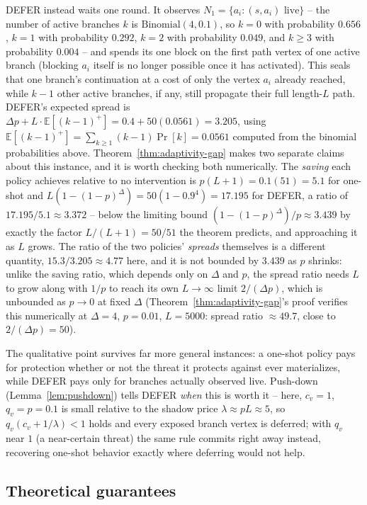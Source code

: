 \documentclass[preprint,11pt]{elsarticle}
\theoremstyle{definition}
\theoremstyle{remark}
\begin{document}
DEFER instead waits one round. It observes $N_1=\{a_i:(s,a_i)\text{ live}\}$
-- the number of active branches $k$ is $\mathrm{Binomial}(4,0.1)$, so
$k=0$ with probability $0.656$, $k=1$ with probability $0.292$, $k=2$ with
probability $0.049$, and $k\ge3$ with probability $0.004$ -- and spends its
one block on the first path vertex of one active branch (blocking $a_i$
itself is no longer possible once it has activated). This seals that one
branch's continuation at a cost of only the vertex $a_i$ already reached,
while $k-1$ other active branches, if any, still propagate their full
length-$L$ path. DEFER's expected spread is
$\Delta p+L\cdot\mathbb E[(k-1)^+]=0.4+50(0.0561)=3.205$, using
$\mathbb E[(k-1)^+]=\sum_{k\ge1}(k-1)\Pr[k]=0.0561$ computed from the
binomial probabilities above. Theorem~\ref{thm:adaptivity-gap} makes two
separate claims about this instance, and it is worth checking both
numerically. The \emph{saving} each policy achieves relative to no
intervention is $p(L+1)=0.1(51)=5.1$ for one-shot and
$L(1-(1-p)^\Delta)=50(1-0.9^4)=17.195$ for DEFER, a ratio of
$17.195/5.1\approx3.372$ -- below the limiting bound
$(1-(1-p)^\Delta)/p\approx3.439$ by exactly the factor $L/(L+1)=50/51$ the
theorem predicts, and approaching it as $L$ grows. The ratio of the two
policies' \emph{spreads} themselves is a different quantity,
$15.3/3.205\approx4.77$ here, and it is not bounded by $3.439$ as $p$
shrinks: unlike the saving ratio, which depends only on $\Delta$ and $p$,
the spread ratio needs $L$ to grow along with $1/p$ to reach its own
$L\to\infty$ limit $2/(\Delta p)$, which is unbounded as $p\to0$ at fixed
$\Delta$ (Theorem~\ref{thm:adaptivity-gap}'s proof verifies this
numerically at $\Delta=4$, $p=0.01$, $L=5000$: spread ratio $\approx49.7$,
close to $2/(\Delta p)=50$).

The qualitative point survives far more general instances: a one-shot
policy pays for protection whether or not the threat it protects against
ever materializes, while DEFER pays only for branches actually observed
live. Push-down (Lemma~\ref{lem:pushdown}) tells DEFER \emph{when} this is
worth it -- here, $c_v=1$, $q_v=p=0.1$ is small relative to the shadow
price $\lambda\approx pL\approx5$, so $q_v(c_v+1/\lambda)<1$ holds and
every exposed branch vertex is deferred; with $q_v$ near $1$ (a
near-certain threat) the same rule commits right away instead, recovering
one-shot behavior exactly where deferring would not help.

\subsection{Theoretical guarantees}\label{sec:defer-theory}
\end{document}
